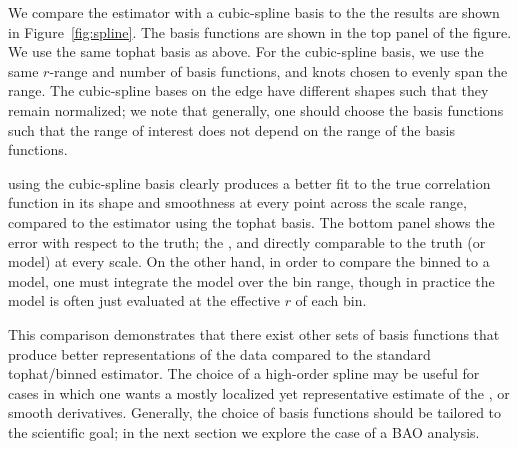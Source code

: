 We compare the estimator with a cubic-spline basis to the  the results are shown in Figure~\ref{fig:spline}.
The basis functions are shown in the top panel of the figure.
We use the same tophat basis as above.
For the cubic-spline basis, we use the same $r$-range and number of basis functions, and knots chosen to evenly span the range. 
The cubic-spline bases on the edge have different shapes such that they remain normalized; we note that generally, one should choose the basis functions such that the \cf range of interest does not depend on the range of the basis functions.

 using the cubic-spline basis clearly produces a better fit to the true correlation function in its shape and smoothness at every point across the scale range, compared to the estimator using the tophat basis.
The bottom panel shows the error with respect to the truth; the , and directly comparable to the truth (or model) at every scale.
On the other hand, in order to compare the binned \cf to a model, one must integrate the model over the bin range, though in practice the model is often just evaluated at the effective $r$ of each bin.

This comparison demonstrates that there exist other sets of basis functions that produce better representations of the data compared to the standard tophat/binned estimator.
The choice of a high-order spline may be useful for cases in which one wants a mostly localized yet representative estimate of the \cf, or smooth derivatives.
Generally, the choice of basis functions should be tailored to the scientific goal; in the next section we explore the case of a BAO analysis.

